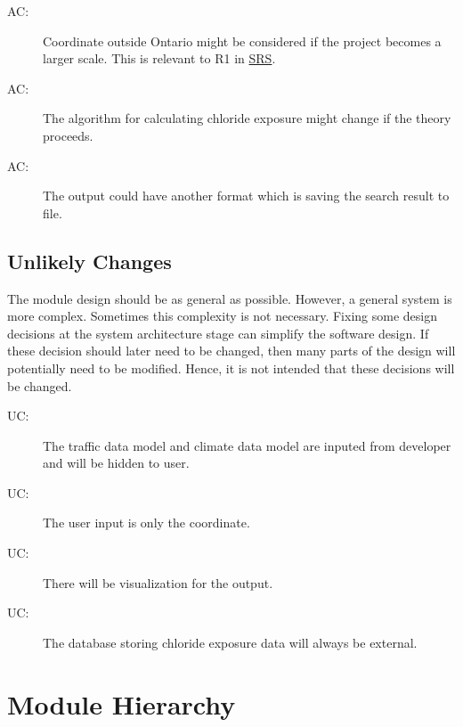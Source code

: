 \documentclass[12pt, titlepage]{article}
\newcounter{acnum}
\newcommand{\actheacnum}{AC\theacnum}
\newcounter{ucnum}
\newcommand{\uctheucnum}{UC\theucnum}
\begin{document}
\begin{description}
\item[ \actheacnum \label{acMoreCoordinate}:] Coordinate outside Ontario might be considered if the project becomes a larger scale. This is relevant to R1 in \href{https://github.com/CynthiaLiu0805/BridgeCorrosion/blob/main/docs/SRS/SRS.pdf}{SRS}.
\item[ \actheacnum \label{acAlgorithm}:] The algorithm for calculating chloride exposure might change if the theory proceeds.
\item[ \actheacnum \label{acOutputFile}:] The output could have another format which is saving the search result to file.

\end{description}

\subsection{Unlikely Changes} \label{SecUchange}

The module design should be as general as possible. However, a general system is
more complex. Sometimes this complexity is not necessary. Fixing some design
decisions at the system architecture stage can simplify the software design. If
these decision should later need to be changed, then many parts of the design
will potentially need to be modified. Hence, it is not intended that these
decisions will be changed.

\begin{description}
\item[ \uctheucnum \label{ucDevInput}:] The traffic data model and climate data model are inputed from developer and will be hidden to user.
\item[ \uctheucnum \label{ucUserInput}:] The user input is only the coordinate.
\item [ \uctheucnum \label{ucOutput}:] There will be visualization for the output.
\item [ \uctheucnum \label{ucDatabase}:] The database storing chloride exposure data will always be external.
\end{description}

\section{Module Hierarchy} \label{SecMH}
\end{document}
